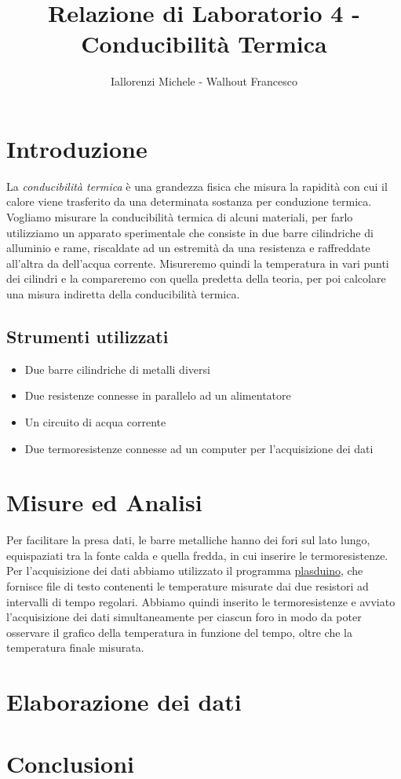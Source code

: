 \documentclass{article}
\title{Relazione di Laboratorio 4 - Conducibilità Termica}
\author{Iallorenzi Michele - Walhout Francesco}
\begin{document}
    \maketitle

    \section{Introduzione}
    La \emph{conducibilità termica} è una grandezza fisica che misura la
    rapidità con cui il calore viene trasferito da una determinata sostanza per
    conduzione termica.\\
    Vogliamo misurare la conducibilità termica di alcuni materiali,
    per farlo utilizziamo un apparato sperimentale che consiste in due barre cilindriche
    di alluminio e rame, riscaldate ad un estremità da una resistenza e raffreddate 
    all'altra da dell'acqua corrente.
    Misureremo quindi la temperatura in vari punti dei cilindri e la compareremo con
    quella predetta della teoria, per poi calcolare una misura indiretta della 
    conducibilità termica.
    \subsection{Strumenti utilizzati}
    \begin{itemize}
        \item Due barre cilindriche di metalli diversi
        \item Due resistenze connesse in parallelo ad un alimentatore
        \item Un circuito di acqua corrente
        \item Due termoresistenze connesse ad un computer per l'acquisizione dei dati
    \end{itemize}
    \section{Misure ed Analisi}
    Per facilitare la presa dati, le barre metalliche hanno dei fori sul lato lungo,
    equispaziati tra la fonte calda e quella fredda, in cui inserire le termoresistenze.\\
    Per l'acquisizione dei dati abbiamo utilizzato il programma \href{https://pythonhosted.org/plasduino/index.html}{plasduino},
    che fornisce file di testo contenenti le temperature misurate dai due resistori
    ad intervalli di tempo regolari. Abbiamo quindi inserito le termoresistenze e 
    avviato l'acquisizione dei dati simultaneamente per ciascun foro in modo
    da poter osservare il grafico della temperatura in funzione del tempo,
    oltre che la temperatura finale misurata.
    \section{Elaborazione dei dati}
    \section{Conclusioni}
\end{document}
